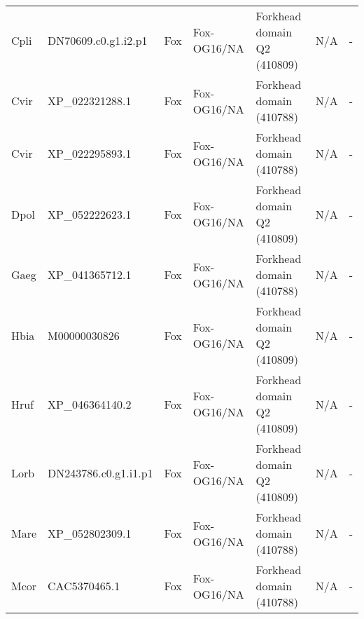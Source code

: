 \documentclass[../main.tex]{subfiles}
\begin{document}
\begin{landscape}
\begin{longtable}{lllllll}
		Cpli           & DN70609.c0.g1.i2.p1   & Fox            & Fox-OG16/NA         & Forkhead domain Q2 (410809)                 & N/A                                                                    & -                    \\
		Cvir           & XP\_022321288.1       & Fox            & Fox-OG16/NA         & Forkhead domain (410788)                    & N/A                                                                    & -                    \\
		Cvir           & XP\_022295893.1       & Fox            & Fox-OG16/NA         & Forkhead domain (410788)                    & N/A                                                                    & -                    \\
		Dpol           & XP\_052222623.1       & Fox            & Fox-OG16/NA         & Forkhead domain Q2 (410809)                 & N/A                                                                    & -                    \\
		Gaeg           & XP\_041365712.1       & Fox            & Fox-OG16/NA         & Forkhead domain (410788)                    & N/A                                                                    & -                    \\
		Hbia           & M00000030826          & Fox            & Fox-OG16/NA         & Forkhead domain Q2 (410809)                 & N/A                                                                    & -                    \\
		Hruf           & XP\_046364140.2       & Fox            & Fox-OG16/NA         & Forkhead domain Q2 (410809)                 & N/A                                                                    & -                    \\
		Lorb           & DN243786.c0.g1.i1.p1  & Fox            & Fox-OG16/NA         & Forkhead domain Q2 (410809)                 & N/A                                                                    & -                    \\
		Mare           & XP\_052802309.1       & Fox            & Fox-OG16/NA         & Forkhead domain (410788)                    & N/A                                                                    & -                    \\
		Mcor           & CAC5370465.1          & Fox            & Fox-OG16/NA         & Forkhead domain (410788)                    & N/A                                                                    & -                    \\

\end{longtable}
\end{landscape}
\end{document}
